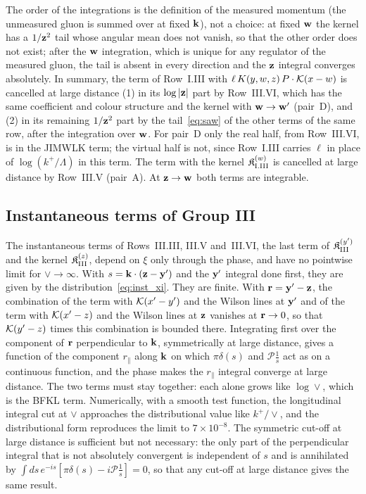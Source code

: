 The order of the integrations is the definition of the measured momentum (the unmeasured gluon is summed over at fixed $\mathbf{k}$), not a choice: at fixed $\mathbf{w}$ the kernel has a $1/\mathbf{z}^2$ tail whose angular mean does not vanish, so that the other order does not exist; after the $\mathbf{w}$ integration, which is unique for any regulator of the measured gluon, the tail is absent in every direction and the $\mathbf{z}$ integral converges absolutely. In summary, the term of Row~I.III with $\ell\,K(y,w,z)\,P\cdot\mathcal{K}(x-w)$ is cancelled at large distance (1) in its $\log|\mathbf{z}|$ part by Row~III.VI, which has the same coefficient and colour structure and the kernel with $\mathbf{w}\to\mathbf{w}'$ (pair~D), and (2) in its remaining $1/\mathbf{z}^2$ part by the tail~\eqref{eq:saw} of the other terms of the same row, after the integration over $\mathbf{w}$. For pair~D only the real half, from Row~III.VI, is in the JIMWLK term; the virtual half is not, since Row~I.III carries $\ell$ in place of $\log(k^+/\Lambda)$ in this term. The term with the kernel $\mathfrak K^{(w)}_{\rm I.III}$ is cancelled at large distance by Row~III.V (pair~A). At $\mathbf{z}\to\mathbf{w}$ both terms are integrable.

\subsection{Instantaneous terms of Group III}\label{sec:fin_inst}

The instantaneous terms of Rows~III.III, III.V and~III.VI, the last term of $\mathfrak K^{(y')}_{\rm III}$ and the kernel $\mathfrak K^{(z)}_{\rm III}$, depend on $\xi$ only through the phase, and have no pointwise limit for $\vee\to\infty$. With $s=\mathbf{k}\cdot(\mathbf{z}-\mathbf{y}')$ and the $\mathbf{y}'$ integral done first, they are given by the distribution~\eqref{eq:inst_xi}. They are finite. With $\mathbf{r}=\mathbf{y}'-\mathbf{z}$, the combination of the term with $\mathcal{K}(x'-y')$ and the Wilson lines at $\mathbf{y}'$ and of the term with $\mathcal{K}(x'-z)$ and the Wilson lines at $\mathbf{z}$ vanishes at $\mathbf{r}\to0$, so that $\mathcal{K}(y'-z)$ times this combination is bounded there. Integrating first over the component of $\mathbf{r}$ perpendicular to $\mathbf{k}$, symmetrically at large distance, gives a function of the component $r_\parallel$ along $\mathbf{k}$ on which $\pi\delta(s)$ and $\mathcal P\frac1s$ act as on a continuous function, and the phase makes the $r_\parallel$ integral converge at large distance. The two terms must stay together: each alone grows like $\log\vee$, which is the BFKL term. Numerically, with a smooth test function, the longitudinal integral cut at $\vee$ approaches the distributional value like $k^+/\vee$, and the distributional form reproduces the limit to $7\times10^{-8}$. The symmetric cut-off at large distance is sufficient but not necessary: the only part of the perpendicular integral that is not absolutely convergent is independent of $s$ and is annihilated by $\int ds\,e^{-is}[\pi\delta(s)-i\mathcal P\frac1s]=0$, so that any cut-off at large distance gives the same result.

